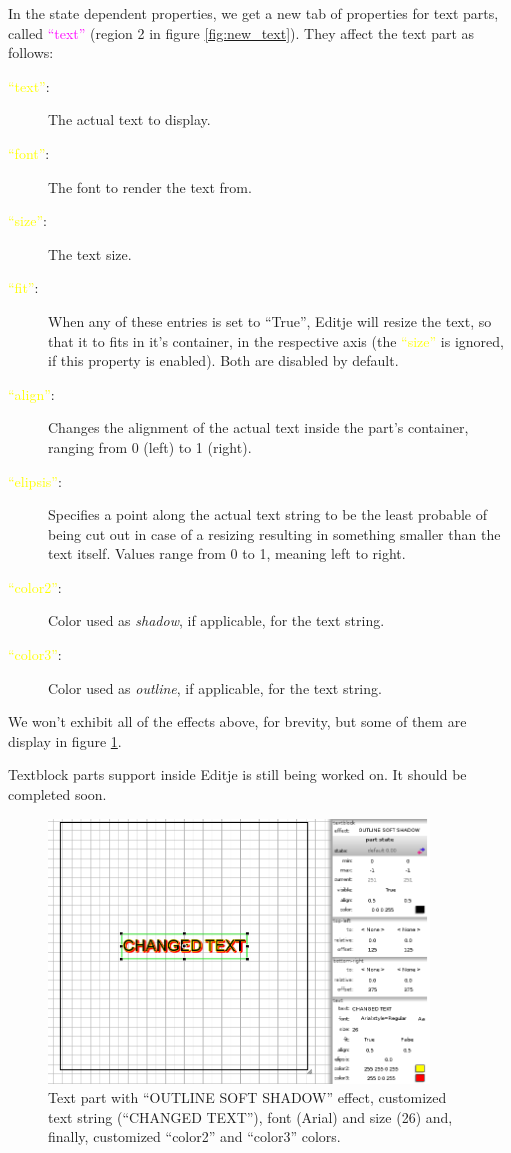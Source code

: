 \documentclass[a4paper]{profusion}
\newcommand{\GUILabel}[1]{\textcolor{magenta}{#1}}
\newcommand{\GUIEditable}[1]{\textcolor{yellow}{#1}} %
\begin{document}
In the state dependent properties, we get a new tab of properties for
text parts, called \GUILabel{``text''} (region 2 in figure
\ref{fig:new_text}).  They affect the text part as follows:

\begin{description}
\item[\GUIEditable{``text''}:] The actual text to display.
\item[\GUIEditable{``font''}:] The font to render the text from.
\item[\GUIEditable{``size''}:] The text size.
\item[\GUIEditable{``fit''}:] When any of these entries is set to
  ``True'', Editje will resize the text, so that it to fits in it's
  container, in the respective axis (the \GUIEditable{``size''} is
  ignored, if this property is enabled). Both are disabled by default.
\item[\GUIEditable{``align''}:] Changes the alignment of the actual
  text inside the part's container, ranging from 0 (left) to 1
  (right).
\item[\GUIEditable{``elipsis''}:] Specifies a point along the actual
  text string to be the least probable of being cut out in case of a
  resizing resulting in something smaller than the text itself. Values
  range from 0 to 1, meaning left to right.
\item[\GUIEditable{``color2''}:] Color used as \emph{shadow}, if
  applicable, for the text string.
\item[\GUIEditable{``color3''}:] Color used as \emph{outline}, if
  applicable, for the text string.
\end{description}

We won't exhibit all of the effects above, for brevity, but some of
them are display in figure \ref{fig:text_misc}.

Textblock parts support inside Editje is still being worked on. It
should be completed soon.


\begin{figure}[h!]
  \centering
  \includegraphics[width=0.9\textwidth]{images/text_misc.png}
  \caption{Text part with ``OUTLINE SOFT SHADOW'' effect, customized
    text string (``CHANGED TEXT''), font (Arial) and size (26) and,
    finally, customized ``color2'' and ``color3'' colors.}
  \label{fig:text_misc}
\end{figure}
\end{document}
